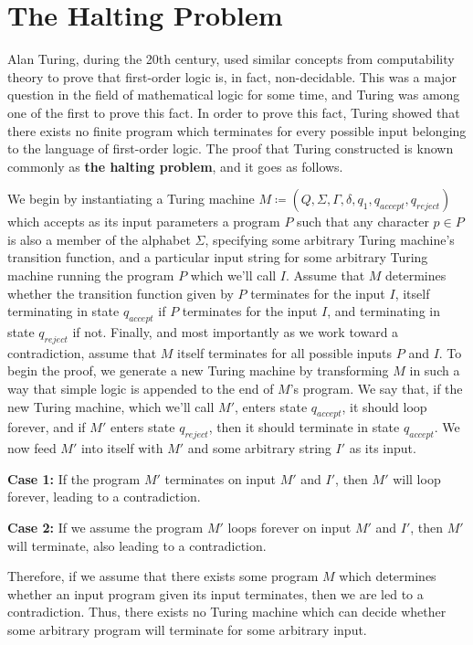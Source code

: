 \documentclass{article}
\begin{document}
\section{The Halting Problem}
Alan Turing, during the 20th century, used similar concepts from computability theory to prove that first-order logic is, in fact, non-decidable.  This was a major question in the field of mathematical logic for some time, and Turing was among one of the first to prove this fact.  In order to prove this fact, Turing showed that there exists no finite program which terminates for every possible input belonging to the language of first-order logic.  The proof that Turing constructed is known commonly as \textbf{the halting problem}, and it goes as follows. \cite{7}
\begin{prf}
	We begin by instantiating a Turing machine $M \coloneq (Q, \Sigma, \Gamma, \delta, q_{1}, q_{accept}, q_{reject})$ which accepts as its input parameters a program $P$ such that any character $p \in P$ is also a member of the alphabet $\Sigma$, specifying some arbitrary Turing machine's transition function, and a particular input string for some arbitrary Turing machine running the program $P$ which we'll call $I$.  Assume that $M$ determines whether the transition function given by $P$ terminates for the input $I$, itself terminating in state $q_{accept}$ if $P$ terminates for the input $I$, and terminating in state $q_{reject}$ if not.  Finally, and most importantly as we work toward a contradiction, assume that $M$ itself terminates for all possible inputs $P$ and $I$.  To begin the proof, we generate a new Turing machine by transforming $M$ in such a way that simple logic is appended to the end of $M$'s program.  We say that, if the new Turing machine, which we'll call $M'$, enters state $q_{accept}$, it should loop forever, and if $M'$ enters state $q_{reject}$, then it should terminate in state $q_{accept}$.  We now feed $M'$ into itself with $M'$ and some arbitrary string $I'$ as its input.\\
\begin{adjustwidth}{0.5cm}{}
	\textbf{Case 1:} If the program $M'$ terminates on input $M'$ and $I'$, then $M'$ will loop forever, leading to a contradiction.\\
\end{adjustwidth}
\begin{adjustwidth}{0.5cm}{}
	\textbf{Case 2:} If we assume the program $M'$ loops forever on input $M'$ and $I'$, then $M'$ will terminate, also leading to a contradiction.\\
\end{adjustwidth}
	\noindent Therefore, if we assume that there exists some program $M$ which determines whether an input program given its input terminates, then we are led to a contradiction.  Thus, there exists no Turing machine which can decide whether some arbitrary program will terminate for some arbitrary input. \cite{5} \qedsymbol
\end{prf}
\end{document}
